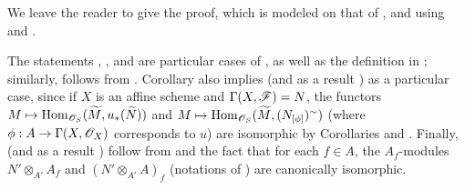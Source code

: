 We leave the reader to give the proof, which is modeled on that of , and
using  and .

\begin{rmk}[1.8.11]
\label{1.1.8.11}
The statements , , and  are particular
cases of , as well as the definition in ; similarly,
 follows from . Corollary  also implies
 (and as a result ) as a particular case, since if $X$ is
an affine scheme and $\Gamma(X,\mathscr{F})=N$, the functors
$M\mapsto{\mathop{\mathrm{Hom}}\nolimits}_{\mathscr{O}_S}(\widetilde{M},u_*(\widetilde{N}))$ and
$M\mapsto{\mathop{\mathrm{Hom}}\nolimits}_{\mathscr{O}_S}(\widetilde{M},(N_{[\phi]})^\sim)$ (where $\phi:A\to\Gamma(X,\mathscr{O}_X)$
corresponds to $u$) are isomorphic by Corollaries  and . Finally,
 (and as a result ) follow from  and the
fact that for each $f\in A$, the $A_f$-modules $N'\otimes_{A'}A_f$ and $(N'\otimes_{A'}A)_f$
(notations of ) are canonically isomorphic.
\end{rmk}

